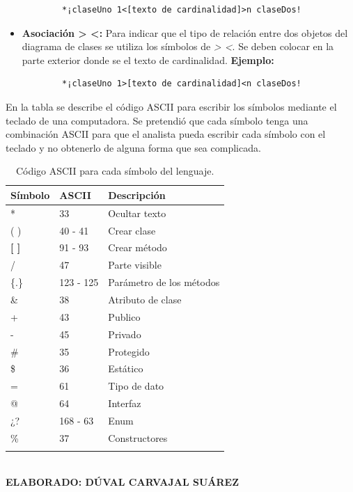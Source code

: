 \begin{itemize}
	\begin{verbatim}
		*¡claseUno 1<[texto de cardinalidad]>n claseDos!
	\end{verbatim}

	\item \textbf{Asociación > <:} Para indicar que el tipo de relación entre dos objetos del diagrama de clases se utiliza los símbolos de \textit{> <}. Se deben colocar en la parte exterior donde se el texto de cardinalidad. \textbf{Ejemplo:}
	
	\begin{verbatim}
		*¡claseUno 1>[texto de cardinalidad]<n claseDos!
	\end{verbatim}
	
\end{itemize}

En la tabla se describe el código ASCII para escribir los símbolos mediante el teclado de una computadora. Se pretendió que cada símbolo tenga una combinación ASCII para que el analista pueda escribir cada símbolo con el teclado y no obtenerlo de alguna forma que sea complicada.

\begin{table}[h!]
	\caption{Código ASCII para cada símbolo del lenguaje.}
	\begin{tabular}{p{2cm}p{4cm}p{5cm}}
		\toprule
		\textbf{Símbolo} & \textbf{ASCII} & \textbf{Descripción} \\
		\midrule
		* & 33 & Ocultar texto \\
		\addlinespace
		( ) & 40 - 41 & Crear clase \\
		\addlinespace
		\textbf{[ ]} & 91 - 93 & Crear método \\
		\addlinespace
		/ & 47 & Parte visible \\
		\addlinespace
		\{.\} & 123 - 125	 & Parámetro de los métodos \\
		\addlinespace 	
		\& & 38 & Atributo de clase \\
		\addlinespace
		+ & 43 & Publico \\
		\addlinespace
		- & 45 & Privado \\
		\addlinespace
		\# & 35 & Protegido \\
		\addlinespace
		\$ & 36 & Estático \\
		\addlinespace
		= & 61 & Tipo de dato \\
		\addlinespace
		@ & 64 & Interfaz \\
		\addlinespace
		¿? & 168 - 63 & Enum \\
		\addlinespace
		\% & 37 & Constructores \\
		\addlinespace
		\bottomrule
	\end{tabular}
	\textbf{ \\ ELABORADO: DÚVAL CARVAJAL SUÁREZ}
\end{table}

